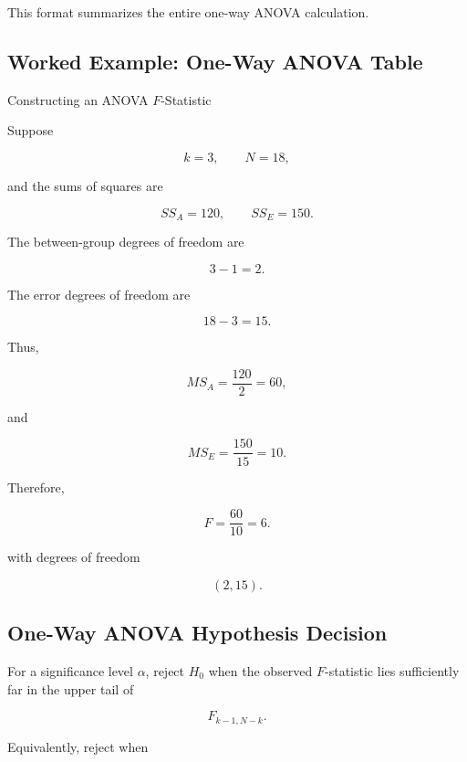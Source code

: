 This format summarizes the entire one-way ANOVA calculation.

\subsection{Worked Example: One-Way ANOVA Table}
\label{subsec:worked-one-way-anova-table}

\begin{workedexamplebox}{Constructing an ANOVA \(F\)-Statistic}

Suppose

\[
k=3,
\qquad
N=18,
\]

and the sums of squares are

\[
SS_A=120,
\qquad
SS_E=150.
\]

The between-group degrees of freedom are

\[
3-1=2.
\]

The error degrees of freedom are

\[
18-3=15.
\]

Thus,

\[
MS_A
=
\frac{120}{2}
=
60,
\]

and

\[
MS_E
=
\frac{150}{15}
=
10.
\]

Therefore,

\begin{answerbox}
\[
\boxed{
F
=
\frac{60}{10}
=
6.
}
\]

with degrees of freedom

\[
\boxed{
(2,15).
}
\]
\end{answerbox}

\end{workedexamplebox}

\subsection{One-Way ANOVA Hypothesis Decision}
\label{subsec:one-way-anova-decision}

For a significance level \(\alpha\), reject \(H_0\) when the observed
\(F\)-statistic lies sufficiently far in the upper tail of

\[
F_{k-1,N-k}.
\]

Equivalently, reject when

